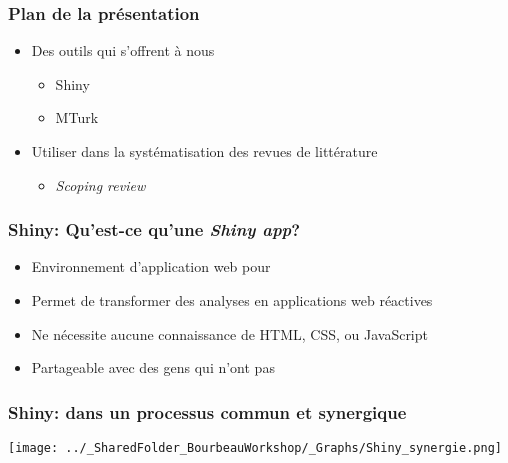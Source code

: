 \documentclass{beamer}
\begin{document}
    \begin{frame}
    
        \frametitle{Plan de la présentation} \vspace{1cm}
        
        \begin{itemize}
        
        \item{Des outils qui s'offrent à nous}
         
          \begin{itemize}
            \item{Shiny}
	    \item{MTurk}
          \end{itemize}
	  
	  
         \item{Utiliser \R dans la systématisation des revues de littérature}
        
          \begin{itemize}
            \item{\emph{Scoping review}}
          \end{itemize}         
        \end{itemize}
        
    \end{frame}


    \begin{frame}
    
      \frametitle{Shiny: Qu'est-ce qu'une \emph{Shiny app}?} \vspace{1cm}
      
    
    
        \begin{itemize}
          \item{Environnement d'application web pour \R}
          \item{Permet de transformer des analyses en applications web réactives}
          \item{Ne nécessite aucune connaissance de HTML, CSS, ou JavaScript}
          \item{Partageable avec des gens qui n’ont pas \R}
        \end{itemize}
          
    \end{frame}  
    

    \begin{frame}
    
      \frametitle{Shiny: dans un processus commun et synergique} \vspace{1cm}
      
        \begin{center}
      	  \texttt{[image: ../\_SharedFolder\_BourbeauWorkshop/\_Graphs/Shiny\_synergie.png]}
        \end{center} 
      
          
    \end{frame}  
    
\end{document}
